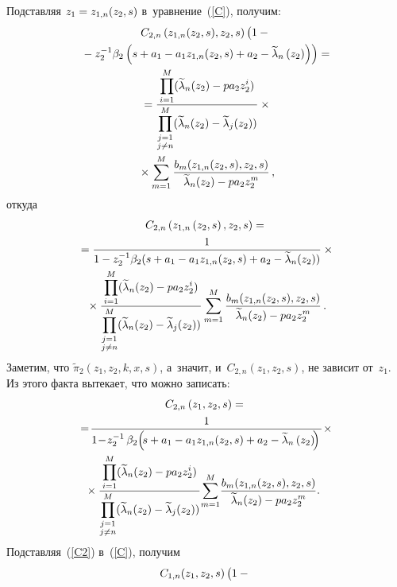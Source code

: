 \begin{multicols}{2}
Подставляя $z_1\hm=z_{1,n}(z_2,s)$ в~уравнение~(\ref{C}), получим:
\begin{multline}
C_{2,n}\left(z_{1,n}(z_2,s),z_2,s\right)
\left(\vphantom{\tilde{\lambda}_n}
1-{}\right.\\
\left.{}-z_2^{-1}\beta_2\left(s+a_1-a_1 z_{1,n}(z_2,s)+a_2-\widetilde{\lambda}_n\left(z_2\right)
\right)\right)={}\\
{}=\fr{\prod\limits_{i=1}^M(\widetilde{\lambda}_n(z_2)-pa_2 z_2^i)}
{\prod\limits_{\substack{j=1\\j\neq n}}^M(\widetilde{\lambda}_n(z_2)-
\widetilde{\lambda}_j(z_2))}\times{}\\
{}\times
\sum\limits_{m=1}^M
\fr{b_m(z_{1,n}(z_2,s),z_2,s)}{\widetilde{\lambda}_n(z_2)-pa_2 z_2^m}\,,
\label{findpi1}
\end{multline}
откуда
\begin{multline*}
C_{2,n}\left(z_{1,n}\left(z_2,s\right),z_2,s\right)={}\\
{}=
\displaystyle\frac{\displaystyle 1\mathstrut}{\displaystyle 1-z_2^{-1}\beta_2(s+a_1-a_1 z_{1,n}(z_2,s)+
a_2-\widetilde{\lambda}_n(z_2))\mathstrut}\times{}\\
{}\times
\displaystyle\frac{\displaystyle \prod\limits_{i=1}^M(\widetilde{\lambda}_n(z_2)-pa_2 z_2^i)\mathstrut}{\displaystyle \prod\limits_{\substack{j=1\\j\neq n}}^M(\widetilde{\lambda}_n(z_2)-
\widetilde{\lambda}_j(z_2))\mathstrut}
\sum\limits_{m=1}^M
\displaystyle\frac{\displaystyle b_m(z_{1,n}(z_2,s),z_2,s)\mathstrut}{\displaystyle \widetilde{\lambda}_n(z_2)-pa_2 z_2^m\mathstrut}\,.
\end{multline*}
Заметим, что $\widetilde{\pi}_2(z_1,z_2,k,x,s)$, а~значит, 
и~$C_{2,n}(z_1,z_2,s)$, не зависит от~$z_1$. Из этого факта вытекает, 
что можно записать:
\begin{multline}
C_{2,n}\left(z_1,z_2,s\right)={}\\
{}=\!
\fr{1}{1\!-\!z_2^{-1}\,\beta_2\!\left(\!s+a_1-a_1 z_{1,n}(z_2,s)+a_2-\widetilde{\lambda}_n
\left(z_2\right)\!\right)}\!\times{}\\
\hspace*{-4mm}{}\times
\fr{\prod\limits_{i=1}^M(\widetilde{\lambda}_n(z_2)-pa_2 z_2^i)}
{\prod\limits_{\substack{j=1\\j\neq n}}^M(\widetilde{\lambda}_n(z_2)-
\widetilde{\lambda}_j(z_2))}
\!\sum\limits_{m=1}^M\!
\fr{b_m(z_{1,n}(z_2,s),z_2,s)}{\widetilde{\lambda}_n(z_2)-pa_2 z_2^m}.\!\!\!
\label{C2}
\end{multline}
Подставляя~(\ref{C2}) в~(\ref{C}), получим
\begin{multline*}
C_{1,n}(z_1,z_2,s)\left(
\vphantom{\tilde{\lambda}_n^{-1}}
1-{}\right.\\

\end{multline*}
\end{multicols}
